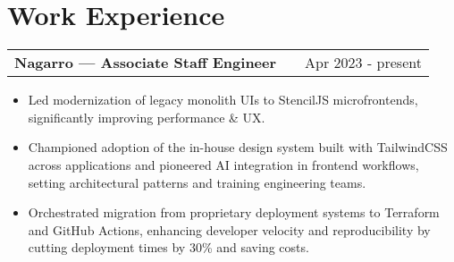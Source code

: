 \documentclass[a4paper,10pt]{article}
\makeatletter
\newenvironment{joblong}[2]
    {
    \begin{tabularx}{\linewidth}{@{}l X r@{}}
    \textbf{#1} & \hfill &  #2 \\[3.75pt]
    \end{tabularx}
    \begin{minipage}[t]{\linewidth}
    \begin{itemize}[nosep,after=\strut, leftmargin=1em, itemsep=3pt,label=--]
    }
    {
    \end{itemize}
    \end{minipage}    
    }
\makeatother
\begin{document}








\section{Work Experience}

\begin{joblong}{Nagarro — Associate Staff Engineer}{Apr 2023 - present}
\item Led modernization of legacy monolith UIs to StencilJS microfrontends, significantly improving performance \& UX.
\item Championed adoption of the in-house design system built with TailwindCSS across applications and pioneered AI integration in frontend workflows, setting architectural patterns and training engineering teams.
\item Orchestrated migration from proprietary deployment systems to Terraform and GitHub Actions, enhancing developer velocity and reproducibility by cutting deployment times by 30\% and saving costs.
\end{joblong}
\end{document}
